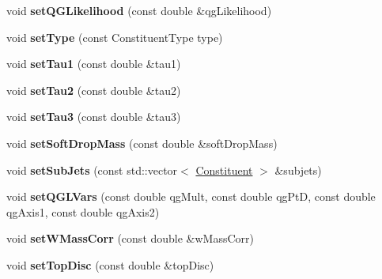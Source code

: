 \begin{DoxyCompactItemize}
\item 
\hypertarget{classConstituent_a8d08fcf43d1d33d4a09854b3a180499b}{void {\bfseries set\-Q\-G\-Likelihood} (const double \&qg\-Likelihood)}\label{classConstituent_a8d08fcf43d1d33d4a09854b3a180499b}

\item 
\hypertarget{classConstituent_addfb4fd94597fee1886d4673256d4835}{void {\bfseries set\-Type} (const Constituent\-Type type)}\label{classConstituent_addfb4fd94597fee1886d4673256d4835}

\item 
\hypertarget{classConstituent_a9d1493cc1e27c929833f5d98b73ddd88}{void {\bfseries set\-Tau1} (const double \&tau1)}\label{classConstituent_a9d1493cc1e27c929833f5d98b73ddd88}

\item 
\hypertarget{classConstituent_ae090779940f2716959ece7eacd94030d}{void {\bfseries set\-Tau2} (const double \&tau2)}\label{classConstituent_ae090779940f2716959ece7eacd94030d}

\item 
\hypertarget{classConstituent_a3e08a3c5233f6cb754404e73e25b1a8c}{void {\bfseries set\-Tau3} (const double \&tau3)}\label{classConstituent_a3e08a3c5233f6cb754404e73e25b1a8c}

\item 
\hypertarget{classConstituent_abacfdb87d076479f5a5dab8147ca2bb3}{void {\bfseries set\-Soft\-Drop\-Mass} (const double \&soft\-Drop\-Mass)}\label{classConstituent_abacfdb87d076479f5a5dab8147ca2bb3}

\item 
\hypertarget{classConstituent_a80a81bb60ea3ed312e058e46b53ff791}{void {\bfseries set\-Sub\-Jets} (const std\-::vector$<$ \hyperlink{classConstituent}{Constituent} $>$ \&subjets)}\label{classConstituent_a80a81bb60ea3ed312e058e46b53ff791}

\item 
\hypertarget{classConstituent_a934831e1872c7ac6f1e777d3069ee55a}{void {\bfseries set\-Q\-G\-L\-Vars} (const double qg\-Mult, const double qg\-Pt\-D, const double qg\-Axis1, const double qg\-Axis2)}\label{classConstituent_a934831e1872c7ac6f1e777d3069ee55a}

\item 
\hypertarget{classConstituent_ac8ce2c1a6eb317adc0d371f5ef49c726}{void {\bfseries set\-W\-Mass\-Corr} (const double \&w\-Mass\-Corr)}\label{classConstituent_ac8ce2c1a6eb317adc0d371f5ef49c726}

\item 
\hypertarget{classConstituent_a61c3073e6ed0f3d5c93c9d8289453cb9}{void {\bfseries set\-Top\-Disc} (const double \&top\-Disc)}\label{classConstituent_a61c3073e6ed0f3d5c93c9d8289453cb9}


\end{DoxyCompactItemize}
